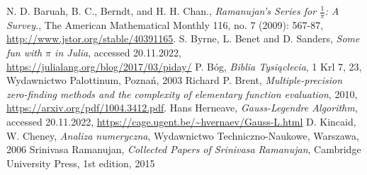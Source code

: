 \documentclass[11pt, wide, leqno]{mwart}
\begin{document}
\koniec

\begin{thebibliography}{69}
        N. D. Baruah, B. C., Berndt, and H. H. Chan.,
        \textit{Ramanujan's Series for $\frac1\pi$: A Survey.}, 
        The American Mathematical Monthly 116, no. 7 (2009): 567-87,
        \url{http://www.jstor.org/stable/40391165}.
        S. Byrne, L. Benet and D. Sanders,
        \textit{Some fun with $\pi$ in Julia},
        accessed 20.11.2022,
        \url{https://julialang.org/blog/2017/03/piday/}
        P. Bóg,
        \textit{Biblia Tysiąclecia}, 1 Krl 7, 23,
        Wydawnictwo Palottinum,
        Poznań, 2003
        Richard P. Brent,
        \textit{Multiple-precision zero-finding methods and the complexity of elementary function evaluation},
        2010,
        \url{https://arxiv.org/pdf/1004.3412.pdf}.
        Hans Herneave,
        \textit{Gauss-Legendre Algorithm},
        accessed 20.11.2022,
        \url{https://cage.ugent.be/~hvernaev/Gauss-L.html}
        D. Kincaid, W. Cheney,
        \textit{Analiza numeryczna},
        Wydawnictwo Techniczno-Naukowe,
        Warszawa, 2006
        Srinivasa Ramanujan,
        \textit{Collected Papers of Srinivasa Ramanujan}, 
        Cambridge University Press,
        1st edition,
        2015
\end{thebibliography}
\end{document}
